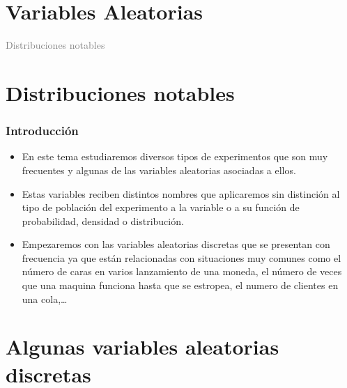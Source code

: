 \documentclass[handout]{beamer}
\title[\red{Matemáticas III GINF}]{}
\author[]{R. Alberich}
\date{}
\newcommand{\gray}[1]{\textcolor{gray}{#1}}
\theoremstyle{plain}
\theoremstyle{definition}
\begin{document}

\beamertemplatedotitem

\lstset{breaklines=true}
\lstset{basicstyle=\ttfamily}


\section{Variables Aleatorias}

\begin{frame}
\vfill
\begin{center}
\gray{\LARGE Distribuciones notables}
\end{center}
\vfill
\end{frame}
\section{Distribuciones notables}

\begin{frame}
\frametitle{Introducción}
\begin{itemize}
\item En este tema estudiaremos diversos tipos de experimentos que son muy frecuentes y algunas de las variables aleatorias asociadas a ellos. 

\item Estas variables reciben distintos nombres
que aplicaremos sin distinción al tipo de población del experimento a la variable o a su
función de probabilidad, densidad o distribución.
\item Empezaremos con las variables aleatorias discretas que se presentan con frecuencia ya que están
relacionadas con situaciones muy comunes como el número de caras en varios lanzamiento de
una moneda, el número de veces que una maquina funciona hasta que se estropea, el numero de
clientes en una cola,\ldots
\end{itemize}

\end{frame}

\section{Algunas variables aleatorias discretas}
\end{document}
